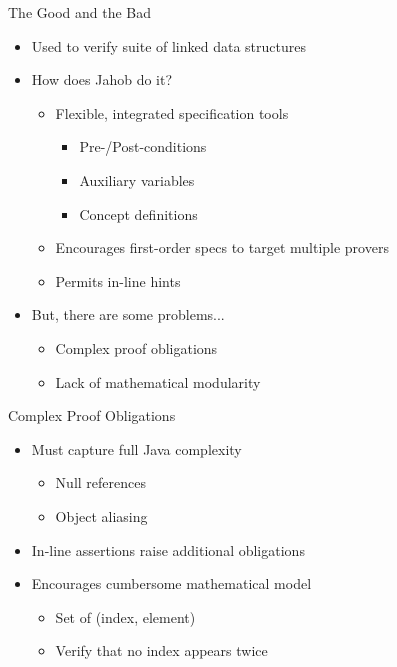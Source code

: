 \documentclass{beamer}
\begin{document}
\begin{frame}
	
\end{frame}


\begin{frame}{The Good and the Bad}
	\begin{itemize}
		\item Used to verify suite of linked data structures
		\item How does Jahob do it?
		\begin{itemize}
			\item Flexible, integrated specification tools
			\begin{itemize}
				\item Pre-/Post-conditions
				\item Auxiliary variables
				\item Concept definitions
			\end{itemize}
			\item Encourages first-order specs to target multiple provers
			\item Permits in-line hints
		\end{itemize}
		\item But, there are some problems...
		\begin{itemize}
			\item Complex proof obligations
			\item Lack of mathematical modularity
		\end{itemize}
	\end{itemize}
\end{frame}


\begin{frame}{Complex Proof Obligations}
	\begin{itemize}
		\item Must capture full Java complexity
		\begin{itemize}
			\item Null references
			\item Object aliasing
		\end{itemize}
		\item In-line assertions raise additional obligations
		\item Encourages cumbersome mathematical model
		\begin{itemize}
			\item Set of (index, element)
			\item Verify that no index appears twice
		\end{itemize}
	\end{itemize}
\end{frame}
\end{document}
